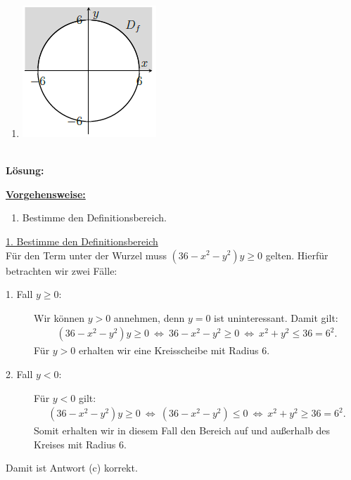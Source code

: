 \begin{enumerate}
\begin{center}
	\end{center}
	\item
	\begin{center}
		\includegraphics[scale=0.6]{pictures/3_4_d}
	\end{center}
\end{enumerate}
\ \\
\textbf{Lösung:}
\begin{mdframed}
\underline{\textbf{Vorgehensweise:}}
\renewcommand{\labelenumi}{\theenumi.}
\begin{enumerate}
\item Bestimme den Definitionsbereich.

\end{enumerate}
\end{mdframed}

\underline{1. Bestimme den Definitionsbereich}\\
Für den Term unter der Wurzel muss $ (36 - x^2 -y^2) y \geq  0 $ gelten.
Hierfür betrachten wir zwei Fälle:
\begin{description}
	\item[1. Fall $ y \geq 0 $:] 
	Wir können $ y > 0  $ annehmen, denn $ y = 0 $ ist uninteressant.
	Damit gilt:
	\begin{align*}
		(36 - x^2 -y^2) y  \geq   0
		\ \Leftrightarrow \ 
		36 - x^2 -y^2   \geq   0
		\ \Leftrightarrow \ 
		x^2 +y^2 \leq 36 = 6^2.
	\end{align*}
	Für $ y > 0  $ erhalten wir eine Kreisscheibe mit Radius $ 6 $.
	
	\item[2. Fall $ y < 0 $:] 
	Für $ y <0  $ gilt:
	\begin{align*}
		(36 - x^2 -y^2) y  \geq   0
		\ \Leftrightarrow \
		(36 - x^2 -y^2) \leq 0
		\ \Leftrightarrow \
		x^2 + y^2 \geq 36 = 6^2.
	\end{align*}
	Somit erhalten wir in diesem Fall den Bereich auf und außerhalb des Kreises mit Radius $ 6 $.
\end{description}
Damit ist Antwort (c) korrekt.
\newpage

